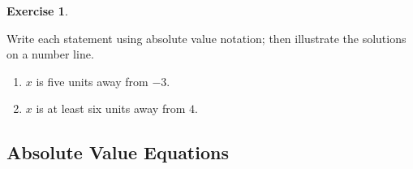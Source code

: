 \documentclass[10pt,]{book}
\theoremstyle{plain}
\theoremstyle{definition}
\theoremstyle{definition}
\theoremstyle{definition}
\theoremstyle{definition}
\theoremstyle{definition}
\newtheorem{exercise}[theorem]{Exercise}
\numberwithin{equation}{section}
\begin{document}
\begin{exercise}\label{exercise-write-abs}

    Write each statement using absolute value notation; then illustrate the solutions on a number line.
    \leavevmode%
\begin{enumerate}[label=*\alph**]
\item\hypertarget{li-349}{}\(x\) is five units away from \(−3\).\item\hypertarget{li-350}{}\(x\) is at least six units away from \(4\).\end{enumerate}
\end{exercise}
\typeout{************************************************}
\typeout{************************************************}
\subsection[Absolute Value Equations]{Absolute Value Equations}\label{subsection-48}
\end{document}
